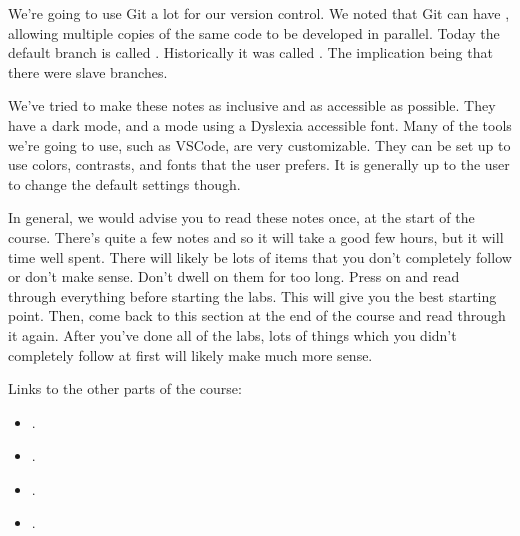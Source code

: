 \documentclass[letterpaper,10pt,british]{sphinxmanual}
\begin{document}
\sphinxAtStartPar
We’re going to use Git a lot for our version control. We noted that Git can have , allowing multiple copies of the same code to be developed in parallel. Today the default branch is called . Historically it was called . The implication being that there were slave branches.

\sphinxAtStartPar
We’ve tried to make these notes as inclusive and as accessible as possible. They have a dark mode, and a mode using a Dyslexia accessible font. Many of the tools we’re going to use, such as VSCode, are very customizable. They can be set up to use colors, contrasts, and fonts that the user prefers. It is generally up to the user to change the default settings though.

\sphinxAtStartPar
In general, we would advise you to read these notes once, at the start of the course. There’s quite a few notes and so it will take a good few hours, but it will time well spent. There will likely be lots of items that you don’t completely follow or don’t make sense. Don’t dwell on them for too long. Press on and read through everything before starting the labs. This will give you the best starting point. Then, come back to this section at the end of the course and read through it again. After you’ve done all of the labs, lots of things which you didn’t completely follow at first will likely make much more sense.

\sphinxAtStartPar
Links to the other parts of the course:
\begin{itemize}
\item {} 
\sphinxAtStartPar
{}.

\item {} 
\sphinxAtStartPar
{}.

\item {} 
\sphinxAtStartPar
{}.

\item {} 
\sphinxAtStartPar
{}.

\end{itemize}



\renewcommand{\indexname}{Index}
\printindex
\end{document}
